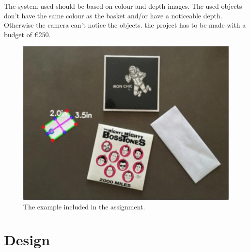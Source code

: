 \documentclass[11pt]{article}
\begin{document}
\noindent The system used should be based on colour and depth images. The used objects don't have the same colour as the basket and/or have a noticeable depth. Otherwise the camera can't notice the objects. the project has to be made with a budget of \euro 250.\\

\begin{figure}[h!]
  \includegraphics[width=0.7\linewidth]{opdracht.png}
  \caption{The example included in the assignment.}
  \label{fig:example}
\end{figure}



\section{Design}
\end{document}
